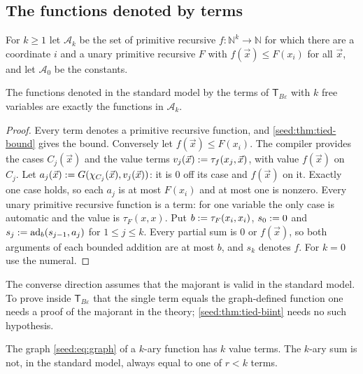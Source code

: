 \subsection{The functions denoted by terms}

For $k\geq1$ let $\mathcal A_k$ be the set of primitive recursive
$f\colon\mathbb N^k\to\mathbb N$ for which there are a coordinate $i$ and a
unary primitive recursive $F$ with $f(\vec x)\leq F(x_i)$ for all $\vec x$,
and let $\mathcal A_0$ be the constants.

\begin{theorem}\label{seed:thm:tbe-exact}
The functions denoted in the standard model by the terms of
$\mathsf{T}_{B\varepsilon}$ with $k$ free variables are exactly the
functions in $\mathcal A_k$.
\end{theorem}

\begin{proof}
Every term denotes a primitive recursive function, and
\cref{seed:thm:tied-bound} gives the bound. Conversely let
$f(\vec x)\leq F(x_i)$. The compiler provides the cases $C_j(\vec x)$ and the
value terms $v_j(\vec x)\mathrel{:=}\tau_f(x_j,\vec x)$, with value $f(\vec x)$ on
$C_j$. Let $a_j(\vec x)\mathrel{:=} G(\chi_{C_j}(\vec x),v_j(\vec x))$: it is $0$
off its case and $f(\vec x)$ on it. Exactly one case holds, so each $a_j$ is
at most $F(x_i)$ and at most one is nonzero. Every unary primitive recursive
function is a term: for one variable the only case is automatic and the
value is $\tau_F(x,x)$. Put $b\mathrel{:=}\tau_F(x_i,x_i)$, $s_0\mathrel{:=}0$ and
$s_j\mathrel{:=}\operatorname{ad}_b(s_{j-1},a_j)$ for $1\leq j\leq k$. Every
partial sum is $0$ or $f(\vec x)$, so both arguments of each bounded addition
are at most $b$, and $s_k$ denotes $f$. For $k=0$ use the numeral.
\end{proof}

The converse direction assumes that the majorant is valid in the standard
model. To prove inside $\mathsf{T}_{B\varepsilon}$ that the single term
equals the graph-defined function one needs a proof of the majorant in the
theory; \cref{seed:thm:tied-biint} needs no such hypothesis.

\begin{proposition}\label{seed:prop:tbe-sharp}
The graph \eqref{seed:eq:graph} of a $k$-ary function has $k$ value terms.
The $k$-ary sum is not, in the standard model, always equal to one of $r<k$
terms.
\end{proposition}

